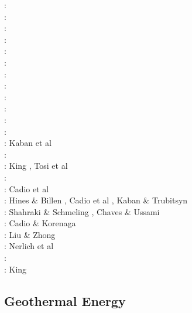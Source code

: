 \begin{scriptsize}
\nineteeneightyfour: \cite{davi84}\cite{hage84}\cite{riff84}\cite{riha84}\\
\nineteeneightyfive: \cite{hacr85}\\
\nineteeneightysix: \cite{davi86}\\
\nineteeneightyeight: \cite{besz88}\cite{fope88}\\
\nineteenninetytwo: \cite{zhgu92}\cite{kiha92}\\
\nineteenninetythree: \cite{zhch93}\cite{rirl93}\\
\nineteenninetyfour: \cite{kiha94}\\
\nineteenninetyfive: \cite{king95}\cite{mopa95}\\
\nineteenninetysix: \cite{mogu96}\\
\nineteenninetyseven: \cite{wean97a}\\
\nineteenninetyeight: \cite{cava98}\cite{chki98}\\
\twothousandone: \cite{zhon01}\\
\twothousandseven: Kaban et al \cite{kart07}\\
\twothousandeight: \cite{meco08}\\
\twothousandnine: King \cite{king09}, Tosi et al \cite{tocm09}\\
\twothousandten: \cite{ghbz10}\cite{spgs10b}\\
\twothousandeleven: Cadio et al \cite{capd11}\\
\twothousandtwelve: Hines \& Billen \cite{hibi12}, Cadio et al \cite{cabp12}, 
                    Kaban \& Trubitsyn \cite{katr12}\\
\twothousandthirteen: Shahraki \& Schmeling \cite{shsc13}, Chaves \& Ussami \cite{chus13}\\
\twothousandfourteen: Cadio \& Korenaga \cite{cako14}\\
\twothousandfifteen: Liu \& Zhong \cite{lizh15}\\
\twothousandsixteen: Nerlich et al \cite{necg16}\\
\twothousandseventeen: \cite{grab17}\\
\twothousandeighteen: King \cite{king18}
\end{scriptsize}

\subsection{Geothermal Energy} 

